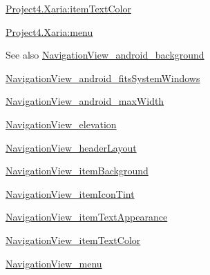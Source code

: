 {\ttfamily \hyperlink{classproject4_1_1xaria_1_1R_1_1styleable_ae7444d646194867fa565bbf74485b80f}{Project4.\+Xaria\+:item\+Text\+Color}}

{\ttfamily \hyperlink{classproject4_1_1xaria_1_1R_1_1styleable_a022d160eabbea5a2a77ffa237987cbe8}{Project4.\+Xaria\+:menu}}

\begin{DoxySeeAlso}{See also}
\hyperlink{classproject4_1_1xaria_1_1R_1_1styleable_a08253d19475959882eff4afebd3d702e}{Navigation\+View\+\_\+android\+\_\+background} 

\hyperlink{classproject4_1_1xaria_1_1R_1_1styleable_a3a323e4a98ccce401c1e052c95ff41d0}{Navigation\+View\+\_\+android\+\_\+fits\+System\+Windows} 

\hyperlink{classproject4_1_1xaria_1_1R_1_1styleable_a5a8dc1c5c2c90070efa716ca76e55965}{Navigation\+View\+\_\+android\+\_\+max\+Width} 

\hyperlink{classproject4_1_1xaria_1_1R_1_1styleable_a40197d42f2fce56d33d3778b865afb7d}{Navigation\+View\+\_\+elevation} 

\hyperlink{classproject4_1_1xaria_1_1R_1_1styleable_aba1cb9b91f8ee6dffd022b886c737544}{Navigation\+View\+\_\+header\+Layout} 

\hyperlink{classproject4_1_1xaria_1_1R_1_1styleable_a55510ee8cd624d814f16034b63474168}{Navigation\+View\+\_\+item\+Background} 

\hyperlink{classproject4_1_1xaria_1_1R_1_1styleable_a205b41948506e966136578f28f200761}{Navigation\+View\+\_\+item\+Icon\+Tint} 

\hyperlink{classproject4_1_1xaria_1_1R_1_1styleable_ac1468f6b443ff3dac67ce32e0eca086f}{Navigation\+View\+\_\+item\+Text\+Appearance} 

\hyperlink{classproject4_1_1xaria_1_1R_1_1styleable_ae7444d646194867fa565bbf74485b80f}{Navigation\+View\+\_\+item\+Text\+Color} 

\hyperlink{classproject4_1_1xaria_1_1R_1_1styleable_a022d160eabbea5a2a77ffa237987cbe8}{Navigation\+View\+\_\+menu} 
\end{DoxySeeAlso}
\mbox{\label{classproject4_1_1xaria_1_1R_1_1styleable_a08253d19475959882eff4afebd3d702e}} 
